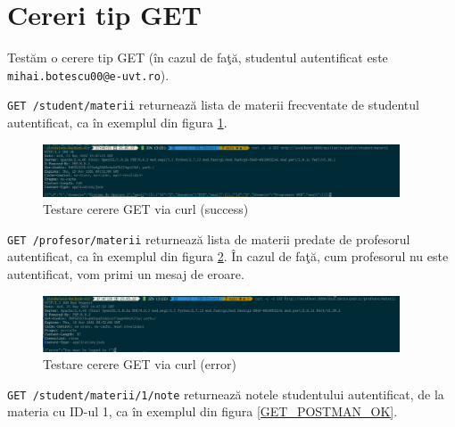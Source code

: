 \documentclass{report}
\begin{document}
\section{Cereri tip GET}

Testăm o cerere tip GET (în cazul de fa\c tă, studentul autentificat este \texttt{mihai.botescu00@e-uvt.ro}).

\texttt{GET /student/materii} returnează lista de materii frecventate de studentul autentificat, ca în exemplul din figura \ref{GET_CURL_OK}.

\begin{figure}[h!]
    \centering
    \includegraphics[width=300pt]{img/GET_OK_curl.png}
    \caption{Testare cerere GET via curl (success)}
    \label{GET_CURL_OK}
\end{figure}

\texttt{GET /profesor/materii} returnează lista de materii predate de profesorul autentificat, ca în exemplul din figura \ref{GET_CURL_ERR}. În cazul de fa\c tă, cum profesorul nu este autentificat, vom primi un mesaj de eroare.

\begin{figure}[h!]
    \centering
    \includegraphics[width=300pt]{img/GET_ERR_curl.png}
    \caption{Testare cerere GET via curl (error)}
    \label{GET_CURL_ERR}
\end{figure}

\newpage 

\texttt{GET /student/materii/1/note} returnează notele studentului autentificat, de la materia cu ID-ul 1, ca în exemplul din figura \ref{GET_POSTMAN_OK}.
\end{document}
